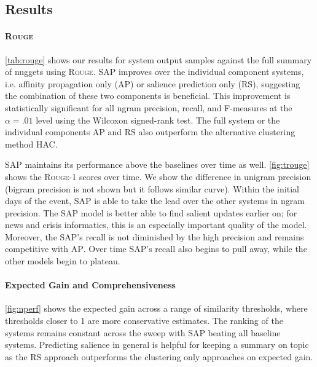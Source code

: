 \subsection{Results}




\paragraph{\textsc{Rouge}} \autoref{tab:rouge} shows our results for system output samples against the 
full summary of nuggets using \textsc{Rouge}. SAP improves over the individual
component systems, i.e. affinity propagation only (AP) or salience prediction
only (RS), suggesting the combination of these two components is beneficial. 
This improvement is statistically 
significant for all ngram precision, recall, and F-measures at the 
$\alpha = .01$ level using the Wilcoxon signed-rank test. 
The full system or the individual components AP and RS also outperform 
the alternative clustering method HAC. 




SAP maintains its performance above the baselines over time 
as well. \autoref{fig:trouge} shows the \textsc{Rouge-1} scores over time. We show 
the difference in unigram precision (bigram precision is not shown but it 
follows similar curve). Within the initial days of the event, 
SAP is able to take the lead over the other systems in ngram 
precision. The SAP model is better able to find salient 
updates earlier on; for news and crisis informatics, 
this is an especially important 
quality of the model. 
Moreover, the SAP's recall is not diminished by the high 
precision and remains competitive with \textsc{AP}. Over time 
SAP's recall also begins to pull away, while the other models
begin to plateau.



\paragraph{Expected Gain and Comprehensiveness}
\autoref{fig:nperf} shows the expected gain across a range of similarity 
thresholds, where thresholds closer to 1 are more conservative estimates. 
The ranking of the systems remains constant across the sweep with 
\textsc{SAP} beating all baseline systems. Predicting salience in 
general is helpful for keeping a summary on topic as the \textsc{RS} approach 
outperforms the clustering only approaches on expected gain.


